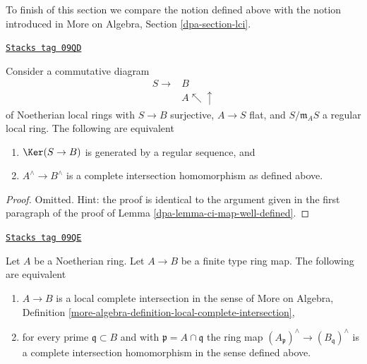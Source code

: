 To finish of this section we compare the notion defined above
with the notion introduced in
More on Algebra, Section \ref{dpa-section-lci}.

\begin{lemma}
\label{dpa-lemma-well-defined-if-you-can-find-good-factorization}
\href{https://stacks.math.columbia.edu/tag/09QD}{\texttt{Stacks tag 09QD}}

Consider a commutative diagram
$$
\begin{array}{cc}S \longrightarrow & B \\  & A \nwarrow\uparrow\end{array}
$$
of Noetherian local rings with $S \to B$ surjective, $A \to S$ flat, and
$S/\mathfrak m_A S$ a regular local ring. The following are equivalent
\begin{enumerate}
\item $\Ker(S \to B)$ is generated by a regular sequence, and
\item $A^\wedge \to B^\wedge$ is a complete intersection homomorphism
as defined above.
\end{enumerate}
\end{lemma}

\begin{proof}

Omitted. Hint: the proof is identical to the argument given in
the first paragraph of the proof of Lemma \ref{dpa-lemma-ci-map-well-defined}.
\end{proof}

\begin{lemma}
\label{dpa-lemma-finite-type-lci-map}
\href{https://stacks.math.columbia.edu/tag/09QE}{\texttt{Stacks tag 09QE}}

Let $A$ be a Noetherian ring.
Let $A \to B$ be a finite type ring map.
The following are equivalent
\begin{enumerate}
\item $A \to B$ is a local complete intersection in the sense of
More on Algebra, Definition
\ref{more-algebra-definition-local-complete-intersection},
\item for every prime $\mathfrak q \subset B$ and with
$\mathfrak p = A \cap \mathfrak q$ the ring map
$(A_\mathfrak p)^\wedge \to (B_\mathfrak q)^\wedge$ is
a complete intersection homomorphism in the sense defined above.
\end{enumerate}
\end{lemma}

